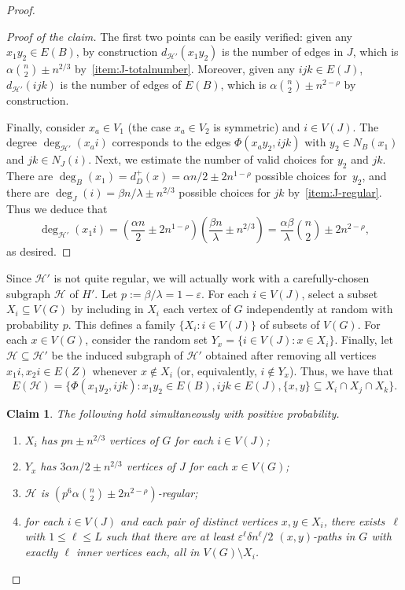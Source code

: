 \documentclass[a4paper, 11pt,reqno]{amsart}
\theoremstyle{plain}
\newtheorem{claim}[theorem]{Claim}
\theoremstyle{definition}
\numberwithin{equation}{section}
\newcommand{\eps}{\varepsilon}
\newenvironment{proofclaim}[1][Proof of the claim]{\begin{proof}[#1]\renewcommand*{\qedsymbol}{\(\square\)}}{\end{proof}}
\renewcommand*{\qedsymbol}{\(\blacksquare\)}
\begin{document}
\begin{proof}
\begin{proofclaim}
	The first two points can be easily verified: given any $x_1 y_2 \in E(B)$, 
	by construction $d_{\mathcal{H}'}(x_1 y_2)$ is the number of edges in $J$, 
	which is $\alpha \binom{n}{2} \pm n^{2/3}$ by~\ref{item:J-totalnumber}.  
	Moreover, given any $ijk \in E(J)$, $d_{\mathcal{H}'}(ijk)$ is the number of 
	edges of $E(B)$, which is $\alpha \binom{n}{2} \pm n^{2 - \rho}$ by construction. 
	
	Finally, consider $x_a \in V_1$ (the case $x_a \in V_2$ is symmetric) and $i \in V(J)$.  
	The degree $\deg_{\mathcal{H}'}(x_a i)$ corresponds to the edges $\Phi(x_a y_2, ijk)$ 
	with $y_2 \in N_B(x_1)$ and $jk \in N_J(i)$.
	Next, we estimate the number of valid choices for $y_2$ and $jk$.
	There are $\deg_B(x_1) = d^+_D(x) = \alpha n / 2 \pm 2n^{1 - \rho}$ possible choices 
	for~$y_2$, and there are $\deg_J(i) = \beta n / \lambda \pm n^{2/3}$ possible choices 
	for $jk$ by~\ref{item:J-regular}.  Thus we deduce that 
	\[ \deg_{\mathcal{H}'}(x_1 i) = 
	\left( \frac{\alpha n}{2} \pm 2n^{1 - \rho} \right) \left( \frac{\beta n}{\lambda} \pm n^{2/3} \right) 
	= \frac{\alpha \beta}{\lambda} \binom{n}{2} \pm 2n^{2 - \rho}, \]
	as desired.
\end{proofclaim}

Since $\mathcal{H}'$ is not quite regular, we will actually work
with a carefully-chosen subgraph $\mathcal{H}$ of ${H}'$.  
Let
\(p
:= \beta/\lambda = 1 - \eps.
\)
For each $i \in V(J)$, select a subset $X_i \subseteq V(G)$ by including 
in $X_i$ each vertex of $G$ independently at random with probability $p$.  
This defines a family $\{X_i : i \in V(J)\}$ of subsets of $V(G)$. 
For each $x\in V(G)$, consider the random set $Y_x = \{i \in V(J) : x\in X_i\}$.
Finally, let $\mathcal{H} \subseteq \mathcal{H}'$ be the induced subgraph 
of $\mathcal{H}'$ obtained after removing all vertices $x_1 i, x_2 i \in E(Z)$ 
whenever $x \notin X_i$ (or, equivalently, $i\notin Y_x$). 
Thus, we have that
\[
E(\mathcal{H}) = \{ \Phi(x_1 y_2, ijk ) : x_1 y_2 \in E(B), ijk
\in E(J), \{x,y\} \subseteq X_i \cap X_j \cap X_k \}.
\]

\begin{claim} \label{claim:Ui}
	The following hold simultaneously with positive probability.
  \begin{enumerate}
	\item \label{nitem:Ui-Ui} $X_i$ has $p n \pm n^{2/3}$ vertices of $G$ for each $i \in V(J)$;
	\item \label{nitem:Ui-Yx} $Y_x$ has $3\alpha n/2 \pm n^{2/3}$ vertices of $J$ for each $x\in V(G)$;
	\item \label{nitem:Ui-Hregular} $\mathcal{H}$ is $(p^6 \alpha \binom{n}{2} \pm 2n^{2 - \rho})$-regular;
	\item \label{nitem:Ui-paths} for each $i \in V(J)$ and each pair of distinct 
	vertices $x, y \in X_i$, there exists~$\ell$ with $1 \leq \ell \leq L$ 
	such that there are at least $\eps^\ell\delta n^\ell/2$ $(x,y)$-paths in $G$
	with exactly $\ell$ inner vertices each, all in $V(G) \setminus X_i$.
\end{enumerate}
\end{claim}


\end{proof}
\end{document}
